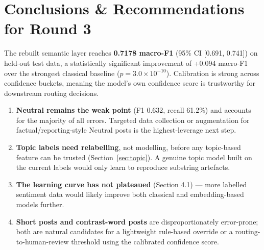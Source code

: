 \documentclass[11pt,a4paper]{article}
\begin{document}
\section*{Conclusions \& Recommendations for Round 3}

The rebuilt semantic layer reaches \textbf{0.7178 macro-F1} (95\% CI [0.691, 0.741]) on held-out test data, a statistically significant improvement of +0.094 macro-F1 over the strongest classical baseline ($p=3.0\times10^{-10}$). Calibration is strong across confidence buckets, meaning the model's own confidence score is trustworthy for downstream routing decisions.

\begin{enumerate}[leftmargin=*, itemsep=4pt]
    \item \textbf{Neutral remains the weak point} (F1 0.632, recall 61.2\%) and accounts for the majority of all errors. Targeted data collection or augmentation for factual/reporting-style Neutral posts is the highest-leverage next step.
    \item \textbf{Topic labels need relabelling}, not modelling, before any topic-based feature can be trusted (Section~\ref{sec:topic}). A genuine topic model built on the current labels would only learn to reproduce substring artefacts.
    \item \textbf{The learning curve has not plateaued} (Section 4.1) --- more labelled sentiment data would likely improve both classical and embedding-based models further.
    \item \textbf{Short posts and contrast-word posts} are disproportionately error-prone; both are natural candidates for a lightweight rule-based override or a routing-to-human-review threshold using the calibrated confidence score.
\end{enumerate}
\end{document}
